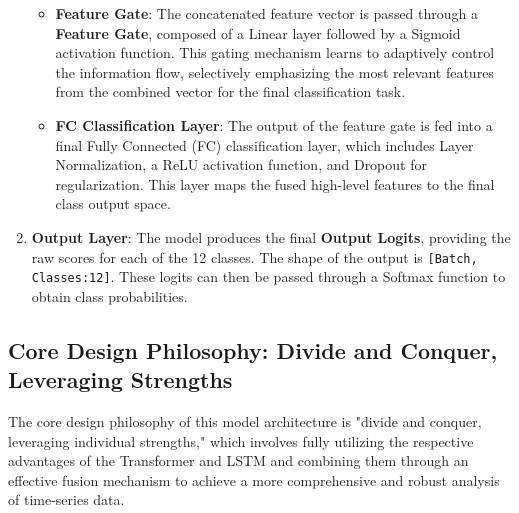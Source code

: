 \begin{enumerate}
\begin{itemize}
    \item \textbf{Feature Gate}: The concatenated feature vector is passed through a \textbf{Feature Gate}, composed of a Linear layer followed by a Sigmoid activation function. This gating mechanism learns to adaptively control the information flow, selectively emphasizing the most relevant features from the combined vector for the final classification task.

    \item \textbf{FC Classification Layer}: The output of the feature gate is fed into a final Fully Connected (FC) classification layer, which includes Layer Normalization, a ReLU activation function, and Dropout for regularization. This layer maps the fused high-level features to the final class output space.
    \end{itemize}

    \item \textbf{Output Layer}: The model produces the final \textbf{Output Logits}, providing the raw scores for each of the 12 classes. The shape of the output is \texttt{[Batch, Classes:12]}. These logits can then be passed through a Softmax function to obtain class probabilities.
\end{enumerate}




\subsection{Core Design Philosophy: Divide and Conquer, Leveraging Strengths}

The core design philosophy of this model architecture is "divide and conquer, leveraging individual strengths," which involves fully utilizing the respective advantages of the Transformer and LSTM and combining them through an effective fusion mechanism to achieve a more comprehensive and robust analysis of time-series data.

